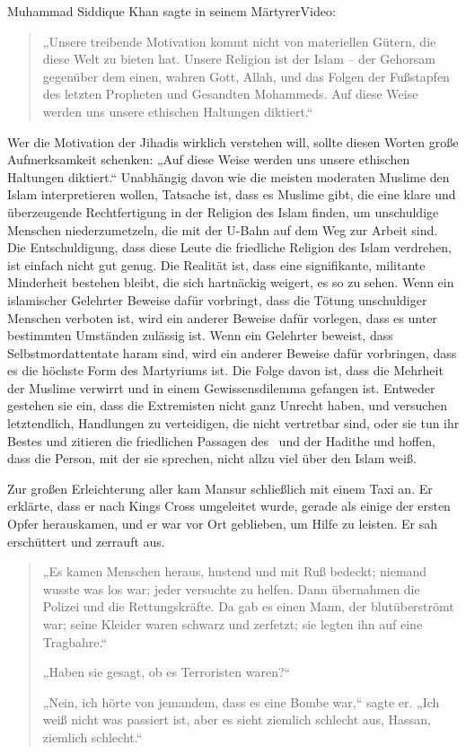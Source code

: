 \documentclass[12pt]{memoir}
\begin{document}
Muhammad Siddique Khan sagte in seinem Märtyrer\–Video:

\begin{quote}
„Unsere treibende Motivation kommt nicht von materiellen Gütern,
die diese Welt zu bieten hat.
Unsere Religion ist der Islam –
der Gehorsam gegenüber dem einen, wahren Gott, Allah,
und das Folgen der Fußstapfen des letzten Propheten und Gesandten Mohammeds.
Auf diese Weise werden uns unsere ethischen Haltungen diktiert.“
\end{quote}

Wer die Motivation der Jihadis wirklich verstehen will,
sollte diesen Worten große Aufmerksamkeit schenken:
„Auf diese Weise werden uns unsere ethischen Haltungen diktiert.“
Unabhängig davon wie die meisten moderaten Muslime
den Islam interpretieren wollen, Tatsache ist,
dass es Muslime gibt, die eine klare und überzeugende Rechtfertigung
in der Religion des Islam finden, um unschuldige Menschen niederzumetzeln,
die mit der U-Bahn auf dem Weg zur Arbeit sind.
Die Entschuldigung, dass diese Leute die friedliche Religion
des Islam verdrehen, ist einfach nicht gut genug.
Die Realität ist, dass eine signifikante, militante Minderheit bestehen bleibt,
die sich hartnäckig weigert, es so zu sehen.
Wenn ein islamischer Gelehrter Beweise dafür vorbringt,
dass die Tötung unschuldiger Menschen verboten ist,
wird ein anderer Beweise dafür vorlegen,
dass es unter bestimmten Umständen zulässig ist.
Wenn ein Gelehrter beweist, dass Selbstmordattentate haram sind,
wird ein anderer Beweise dafür vorbringen,
dass es die höchste Form des Martyriums ist.
Die Folge davon ist, dass die Mehrheit der Muslime verwirrt
und in einem Gewissensdilemma gefangen ist.
Entweder gestehen sie ein, dass die Extremisten nicht ganz Unrecht haben,
und versuchen letztendlich, Handlungen zu verteidigen,
die nicht vertretbar sind, oder sie tun ihr Bestes
und zitieren die friedlichen Passagen des \Quran\ und der Hadithe
und hoffen, dass die Person, mit der sie sprechen,
nicht allzu viel über den Islam weiß.

Zur großen Erleichterung aller kam Mansur schließlich mit einem Taxi an.
Er erklärte, dass er nach Kings Cross umgeleitet wurde,
gerade als einige der ersten Opfer herauskamen,
und er war vor Ort geblieben, um Hilfe zu leisten.
Er sah erschüttert und zerrauft aus.

\begin{quote}
„Es kamen Menschen heraus, hustend und mit Ruß bedeckt;
niemand wusste was los war; jeder versuchte zu helfen.
Dann übernahmen die Polizei und die Rettungskräfte.
Da gab es einen Mann, der blutüberströmt war;
seine Kleider waren schwarz und zerfetzt;
sie legten ihn auf eine Tragbahre.“

„Haben sie gesagt, ob es Terroristen waren?“

„Nein, ich hörte von jemandem, dass es eine Bombe war,“ sagte er.
„Ich weiß nicht was passiert ist, aber es sieht ziemlich schlecht aus,
Hassan, ziemlich schlecht.“
\end{quote}
\end{document}

